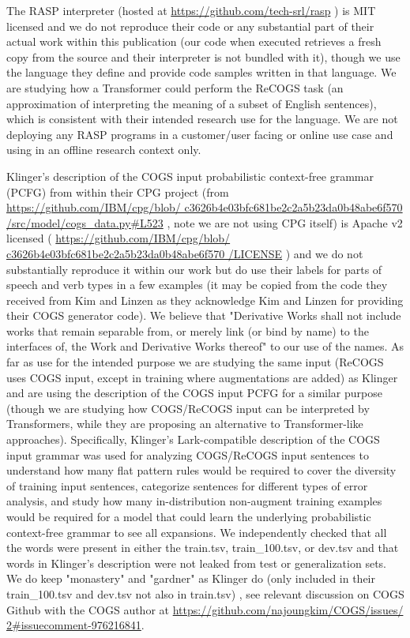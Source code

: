 \documentclass[11pt]{article}
\begin{document}
The RASP \cite{Weiss2021} interpreter (hosted at \href{https://github.com/tech-srl/rasp}{https://github.com/tech-srl/rasp} ) is MIT licensed and we do not reproduce their code or any substantial part of their actual work within this publication (our code when executed retrieves a fresh copy from the source and their interpreter is not bundled with it), though we use the language they define and provide code samples written in that language. We are studying how a Transformer could perform the ReCOGS task (an approximation of interpreting the meaning of a subset of English sentences), which is consistent with their intended research use for the language. We are not deploying any RASP programs in a customer/user facing or online use case and using in an offline research context only.
 
Klinger's description of the COGS input probabilistic context-free grammar (PCFG) from within their CPG project (from \href{https://github.com/IBM/cpg/blob/c3626b4e03bfc681be2c2a5b23da0b48abe6f570/src/model/cogs_data.py\#L523}{https://github.com/IBM/cpg/blob/
c3626b4e03bfc681be2c2a5b23da0b48abe6f570
/src/model/cogs\_data.py\#L523} , note we are not using CPG itself) is Apache v2 licensed ( \href{https://github.com/IBM/cpg/blob/c3626b4e03bfc681be2c2a5b23da0b48abe6f570/LICENSE}{https://github.com/IBM/cpg/blob/
c3626b4e03bfc681be2c2a5b23da0b48abe6f570
/LICENSE} ) and we do not substantially reproduce it within our work but do use their labels for parts of speech and verb types in a few examples (it may be copied from the code they received from Kim and Linzen as they acknowledge Kim and Linzen for providing their COGS generator code). We believe that "Derivative Works shall not include works that remain separable from, or merely link (or bind by name) to the interfaces of, the Work and Derivative Works thereof" to our use of the names. As far as use for the intended purpose we are studying the same input (ReCOGS uses COGS input, except in training where augmentations are added) as Klinger and are using the description of the COGS input PCFG for a similar purpose (though we are studying how COGS/ReCOGS input can be interpreted by Transformers, while they are proposing an alternative to Transformer-like approaches). Specifically, Klinger's Lark-compatible description of the COGS input grammar was used for analyzing COGS/ReCOGS input sentences to understand how many flat pattern rules would be required to cover the diversity of training input sentences, categorize sentences for different types of error analysis, and study how many in-distribution non-augment training examples would be required for a model that could learn the underlying probabilistic context-free grammar to see all expansions. We independently checked that all the words were present in either the train.tsv, train\_100.tsv, or dev.tsv and that words in Klinger's description were not leaked from test or generalization sets. We do keep "monastery" and "gardner" as Klinger do (only included in their train\_100.tsv and dev.tsv not also in train.tsv) , see relevant discussion on COGS Github with the COGS author at \href{https://github.com/najoungkim/COGS/issues/2#issuecomment-976216841}{https://github.com/najoungkim/COGS/issues/
2\#issuecomment-976216841}.
\end{document}
